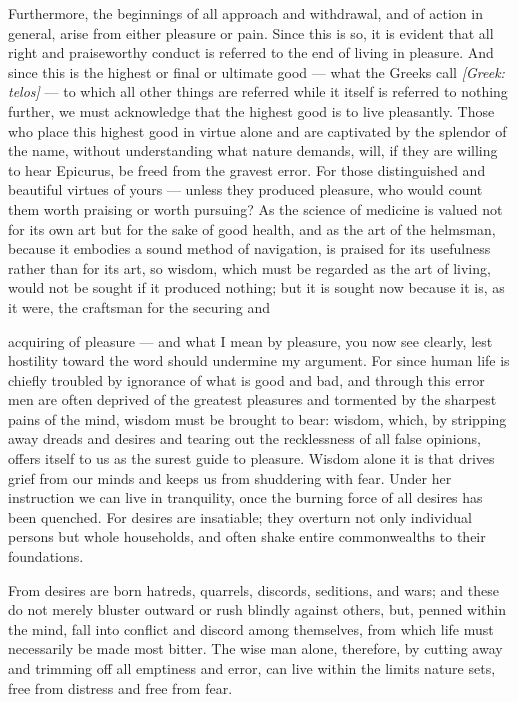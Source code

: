  Furthermore, the beginnings of all approach and withdrawal, and of action in general, arise from either pleasure or pain. Since this is so, it is evident that all right and praiseworthy conduct is referred to the end of living in pleasure. And since this is the highest or final or ultimate good — what the Greeks call \textit{[Greek: telos]} — to which all other things are referred while it itself is referred to nothing further, we must acknowledge that the highest good is to live pleasantly. Those who place this highest good in virtue alone and are captivated by the splendor of the name, without understanding what nature demands, will, if they are willing to hear Epicurus, be freed from the gravest error. For those distinguished and beautiful virtues of yours — unless they produced pleasure, who would count them worth praising or worth pursuing? As the science of medicine is valued not for its own art but for the sake of good health, and as the art of the helmsman, because it embodies a sound method of navigation, is praised for its usefulness rather than for its art, so wisdom, which must be regarded as the art of living, would not be sought if it produced nothing; but it is sought now because it is, as it were, the craftsman for the securing and

 acquiring of pleasure — and what I mean by pleasure, you now see clearly, lest hostility toward the word should undermine my argument. For since human life is chiefly troubled by ignorance of what is good and bad, and through this error men are often deprived of the greatest pleasures and tormented by the sharpest pains of the mind, wisdom must be brought to bear: wisdom, which, by stripping away dreads and desires and tearing out the recklessness of all false opinions, offers itself to us as the surest guide to pleasure. Wisdom alone it is that drives grief from our minds and keeps us from shuddering with fear. Under her instruction we can live in tranquility, once the burning force of all desires has been quenched. For desires are insatiable; they overturn not only individual persons but whole households, and often shake entire commonwealths to their foundations.

 From desires are born hatreds, quarrels, discords, seditions, and wars; and these do not merely bluster outward or rush blindly against others, but, penned within the mind, fall into conflict and discord among themselves, from which life must necessarily be made most bitter. The wise man alone, therefore, by cutting away and trimming off all emptiness and error, can live within the limits nature sets, free from distress and free from fear.

